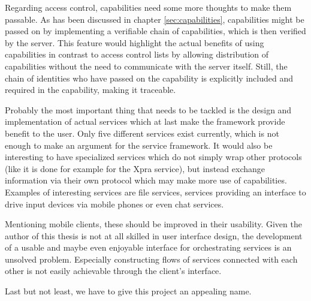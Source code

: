 Regarding access control, capabilities need some more thoughts to make them passable.
As has been discussed in chapter \ref{sec:capabilities}, capabilities might be passed on by implementing a verifiable chain of capabilities, which is then verified by the server.
This feature would highlight the actual benefits of using capabilities in contrast to access control lists by allowing distribution of capabilities without the need to communicate with the server itself.
Still, the chain of identities who have passed on the capability is explicitly included and required in the capability, making it traceable.

Probably the most important thing that needs to be tackled is the design and implementation of actual services which at last make the framework provide benefit to the user.
Only five different services exist currently, which  is not enough to make an argument for the service framework.
It would also be interesting to have specialized services which do not simply wrap other protocols (like it is done for example for the Xpra service), but instead exchange information via their own protocol which may make more use of capabilities.
Examples of interesting services are file services, services providing an interface to drive input devices via mobile phones or even chat services.

Mentioning mobile clients, these should be improved in their usability.
Given the author of this thesis is not at all skilled in user interface design, the development of a usable and maybe even enjoyable interface for orchestrating services is an unsolved problem.
Especially constructing flows of services connected with each other is not easily achievable through the client's interface.

Last but not least, we have to give this project an appealing name.

